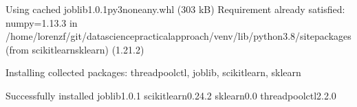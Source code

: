 \documentclass[letterpaper,10pt,english]{jupyterBook}
\begin{document}
\begin{sphinxVerbatim}[commandchars=\\\{\}]
  Using cached joblib\PYGZhy{}1.0.1\PYGZhy{}py3\PYGZhy{}none\PYGZhy{}any.whl (303 kB)
Requirement already satisfied: numpy\PYGZgt{}=1.13.3 in /home/lorenzf/git/data\PYGZhy{}science\PYGZhy{}practical\PYGZhy{}approach/venv/lib/python3.8/site\PYGZhy{}packages (from scikit\PYGZhy{}learn\PYGZhy{}\PYGZgt{}sklearn) (1.21.2)
\end{sphinxVerbatim}

\begin{sphinxVerbatim}[commandchars=\\\{\}]
Installing collected packages: threadpoolctl, joblib, scikit\PYGZhy{}learn, sklearn
\end{sphinxVerbatim}

\begin{sphinxVerbatim}[commandchars=\\\{\}]
Successfully installed joblib\PYGZhy{}1.0.1 scikit\PYGZhy{}learn\PYGZhy{}0.24.2 sklearn\PYGZhy{}0.0 threadpoolctl\PYGZhy{}2.2.0
\end{sphinxVerbatim}

\begin{sphinxVerbatim}[commandchars=\\\{\}]
   
\end{sphinxVerbatim}

\begin{sphinxVerbatim}[commandchars=\\\{\}]
    \PYG{p}{[}\PYG{p}{]} 
\end{sphinxVerbatim}
\end{document}
